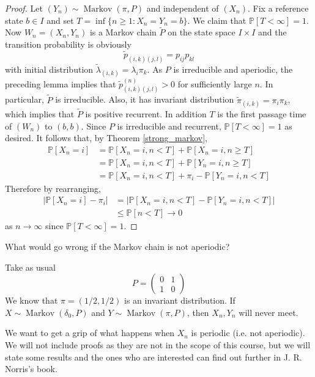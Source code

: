 \begin{proof}
    Let $(Y_n)\sim\operatorname{Markov}(\pi,P)$ and independent of $(X_n)$.
    Fix a reference state $b\in I$ and set $T=\inf\{n\ge 1:X_n=Y_n=b\}$.
    We claim that $\mathbb P[T<\infty]=1$.
    Now $W_n=(X_n,Y_n)$ is a Markov chain $\tilde{P}$ on the state space $I\times I$ and the transition probability is obviously
    $$\tilde{p}_{(i,k)(j,l)}=p_{ij}p_{kl}$$
    with initial distribution $\tilde{\lambda}_{(i,k)}=\lambda_i\pi_k$.
    As $P$ is irreducible and aperiodic, the preceding lemma implies that $\tilde{p}_{(i,k)(j,l)}^{(n)}>0$ for sufficiently large $n$.
    In particular, $\tilde{P}$ is irreducible.
    Also, it has invariant distribution $\tilde{\pi}_{(i,k)}=\pi_i\pi_k$, which implies that $\tilde{P}$ is positive recurrent.
    In addition $T$ is the first passage time of $(W_n)$ to $(b,b)$.
    Since $P$ is irreducible and recurrent, $\mathbb P[T<\infty]=1$ as desired.
    It follows that, by Theorem \ref{strong_markov},
    \begin{align*}
        \mathbb P[X_n=i]&=\mathbb P[X_n=i,n<T]+\mathbb P[X_n=i,n\ge T]\\
        &=\mathbb P[X_n=i,n<T]+\mathbb P[Y_n=i,n\ge T]\\
        &=\mathbb P[X_n=i,n<T]+\pi_i-\mathbb P[Y_n=i,n< T]
    \end{align*}
    Therefore by rearranging,
    \begin{align*}
        |\mathbb P[X_n=i]-\pi_i|&=|\mathbb P[X_n=i,n<T]-\mathbb P[Y_n=i,n< T]|\\
        &\le\mathbb P[n<T]\to 0
    \end{align*}
    as $n\to\infty$ since $\mathbb P[T<\infty]=1$.
\end{proof}
What would go wrong if the Markov chain is not aperiodic?
\begin{example}
    Take as usual
    $$P=\begin{pmatrix}
        0&1\\
        1&0
    \end{pmatrix}$$
    We know that $\pi=(1/2,1/2)$ is an invariant distribution.
    If $X\sim\operatorname{Markov}(\delta_0,P)$ and $Y\sim\operatorname{Markov}(\pi,P)$, then $X_n,Y_n$ will never meet.
\end{example}
We want to get a grip of what happens when $X_n$ is periodic (i.e. not aperiodic).
We will not include proofs as they are not in the scope of this course, but we will state some results and the ones who are interested can find out further in J. R. Norris's book.
